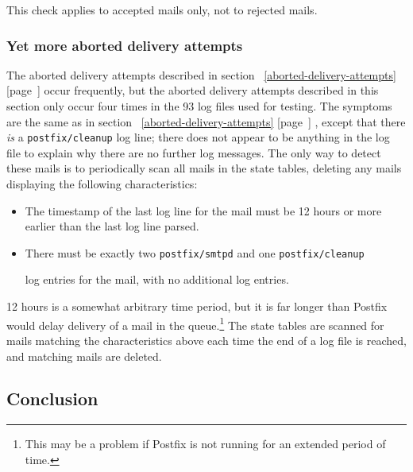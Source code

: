 \documentclass[a4paper,12pt,draft]{article}
\newcommand{\refwithpage}[1]{%
    \empty{}\ref{#1} [page~\pageref{#1}]%
}
\newcommand{\daemon}[1]{%
    \texttt{postfix/#1}%
}
\begin{document}
This check applies to accepted mails only, not to rejected mails.

\subsubsection{Yet more aborted delivery attempts}

\label{yet-more-aborted-delivery-attempts}

The aborted delivery attempts described in
section~\refwithpage{aborted-delivery-attempts} occur frequently, but the
aborted delivery attempts described in this section only occur four times
in the 93 log files used for testing.  The symptoms are the same as in
section~\refwithpage{aborted-delivery-attempts}, except that there
\textit{is\/} a \daemon{cleanup} log line; there does not appear to be
anything in the log file to explain why there are no further log messages.
The only way to detect these mails is to periodically scan all mails in the
state tables, deleting any mails displaying the following characteristics:

\begin{itemize}

    \item The timestamp of the last log line for the mail must be 12 hours
        or more earlier than the last log line parsed.

    \item There must be exactly two \daemon{smtpd} and one \daemon{cleanup}
        log entries for the mail, with no additional log entries.

\end{itemize}

12 hours is a somewhat arbitrary time period, but it is far longer than
Postfix would delay delivery of a mail in the queue.\footnote{This may be a
problem if Postfix is not running for an extended period of time.}  The
state tables are scanned for mails matching the characteristics above each
time the end of a log file is reached, and matching mails are deleted.

\subsection{Conclusion}
\end{document}
